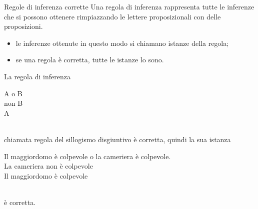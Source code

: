 \documentclass[aspectratio=169,10pt,dvipsnames,handout]{beamer}
\begin{document}
\begin{frame}{Regole di inferenza corrette}
	Una regola di inferenza rappresenta tutte le inferenze che si possono ottenere rimpiazzando le lettere proposizionali con delle proposizioni.
	\begin{itemize}
		\item le inferenze ottenute in questo modo si chiamano \alert{istanze} della regola;
		\item se una regola è corretta, tutte le istanze lo sono.
	\end{itemize}
	\begin{example}
		La regola di inferenza\\
		\medskip
		\qquad
		\begin{inference}
			A o B\\
			non B\\
			\hline
			A
		\end{inference}\\
		\medskip
		chiamata \alert{regola del sillogismo disgiuntivo} è corretta, quindi la sua istanza\\
		\medskip
		\qquad
		\begin{inference}
			Il maggiordomo è colpevole o la cameriera è colpevole.\\
			La cameriera non è colpevole\\
			\hline
			Il maggiordomo è colpevole
		\end{inference}\\

		\medskip
		è corretta.
	\end{example}
\end{frame}
\end{document}

